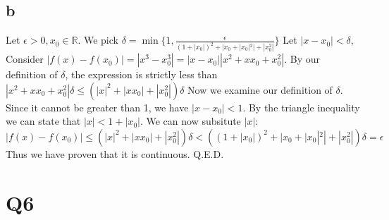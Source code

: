 \documentclass[12pt]{article}
\newcommand{\R}{\mathbb{R}}
\begin{document}
\subsection{b}
Let $\epsilon > 0, x_0 \in \R$. We pick $\delta = \min \{1, \frac{\epsilon}{(1+|x_0|)^2+|x_0+|x_0|^2|+|x_0^2|} \}$
\newline
Let $|x-x_0|<\delta$, Consider $|f(x)-f(x_0)| = |x^3-x_0^3| = |x-x_0||x^2+xx_0+x_0^2|$. By our definition of $\delta$, the expression is strictly less than $|x^2+xx_0+x_0^2|\delta \leq (|x|^2+|xx_0|+|x_0^2|)\delta$
\newline
Now we examine our definition of $\delta$. Since it cannot be greater than 1, we have $|x-x_0|<1$. By the triangle inequality we can state that $|x|< 1+|x_0|$.
\newline
We can now subsitute $|x|$:
$$|f(x)-f(x_0)| \leq (|x|^2+|xx_0|+|x_0^2|)\delta <((1+|x_0|)^2+|x_0+|x_0|^2|+|x_0^2|)\delta = \epsilon$$
Thus we have proven that it is continuous.
\newline
Q.E.D.
\newpage


\section{Q6}
\end{document}

